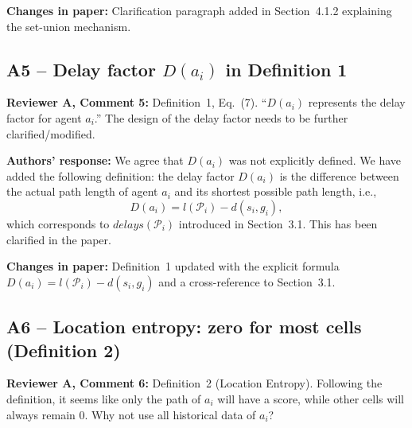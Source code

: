 \documentclass[review]{jair}
\begin{document}
\begin{changebox}
\textbf{Changes in paper:} Clarification paragraph added in Section~4.1.2 explaining the set-union mechanism.
\end{changebox}

\subsection*{A5 -- Delay factor $D(a_i)$ in Definition 1}

\begin{reviewerbox}
\textbf{Reviewer A, Comment 5:} Definition~1, Eq.~(7). ``$D(a_i)$ represents the delay factor for agent $a_i$.'' The design of the delay factor needs to be further clarified/modified.
\end{reviewerbox}

\begin{authorbox}
\textbf{Authors' response:} We agree that $D(a_i)$ was not explicitly defined. We have added the following definition: the delay factor $D(a_i)$ is the difference between the actual path length of agent $a_i$ and its shortest possible path length, i.e.,
\[
D(a_i) = l(\mathcal{P}_i) - d(s_i, g_i),
\]
which corresponds to $\mathit{delays}(\mathcal{P}_i)$ introduced in Section~3.1. This has been clarified in the paper.
\end{authorbox}

\begin{changebox}
\textbf{Changes in paper:} Definition~1 updated with the explicit formula $D(a_i) = l(\mathcal{P}_i) - d(s_i, g_i)$ and a cross-reference to Section~3.1.
\end{changebox}

\subsection*{A6 -- Location entropy: zero for most cells (Definition 2)}

\begin{reviewerbox}
\textbf{Reviewer A, Comment 6:} Definition~2 (Location Entropy). Following the definition, it seems like only the path of $a_i$ will have a score, while other cells will always remain 0. Why not use all historical data of $a_i$?
\end{reviewerbox}
\end{document}
